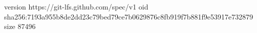 version https://git-lfs.github.com/spec/v1
oid sha256:7193a955b8de2dd23c79bed79ce7b0629876c8fb919f7b881f9e53917e732879
size 87496
